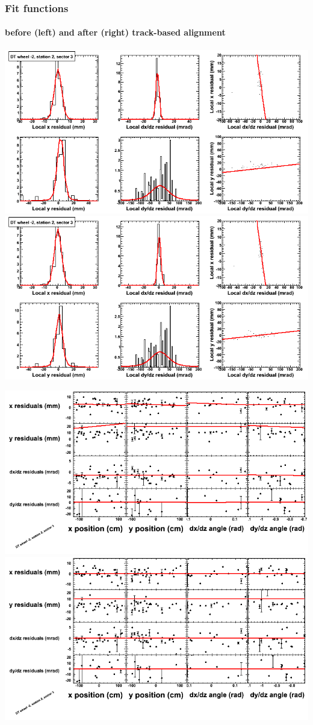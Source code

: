\documentclass[compress]{beamer}
\begin{document}
\begin{frame}
\frametitle{Fit functions}
\framesubtitle{before (left) and after (right) track-based alignment}
\includegraphics[width=0.5\linewidth]{fitfunctions_re01/MBwhAst2sec03_bellcurves.png} \includegraphics[width=0.5\linewidth]{fitfunctions_re05/MBwhAst2sec03_bellcurves.png}

\includegraphics[width=0.5\linewidth]{fitfunctions_re01/MBwhAst2sec03_polynomials.png} \includegraphics[width=0.5\linewidth]{fitfunctions_re05/MBwhAst2sec03_polynomials.png}
\end{frame}
\end{document}
